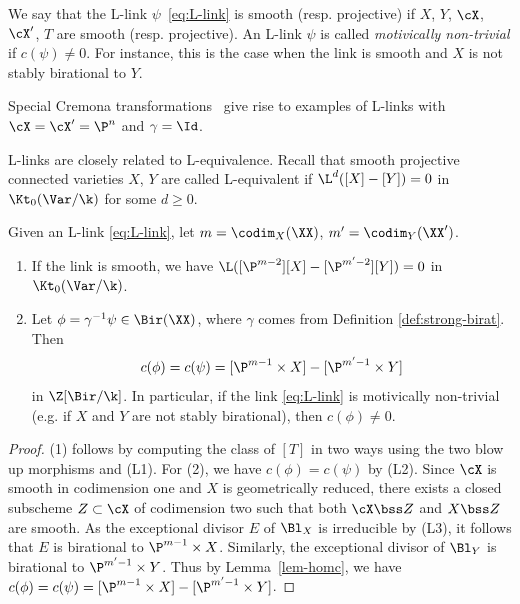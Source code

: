 We say that the L-link $\psi$~\eqref{eq:L-link} is smooth
(resp. projective)
if $X$, $Y$, $\cX$, $\cX'$, $T$
are smooth (resp. projective).
An L-link $\psi$
is called \emph{motivically non-trivial} if $c(\psi) \ne 0$.
For instance, this is the case when
the link is smooth and
$X$ is not stably birational to $Y$.


\begin{example}
\notready
Special Cremona transformations~\cite{Crauder-Katz} give rise
to examples of L-links with
$\cX = \cX' = \P^n$
and $\gamma = \Id$.
\end{example}

L-links are closely related to L-equivalence.
Recall that smooth
projective connected
varieties
$X$, $Y$
are
called
L-equivalent
if $\L^d([X]-[Y]) = 0$
in $\Kt_0(\Var/\k)$
for some $d \ge 0$.

\begin{lemma}
\notready\label{lemma:L-link}
Given an L-link \eqref{eq:L-link},
let $m = \codim_X(\XX)$,
$m' = \codim_Y(\XX')$.
\begin{enumerate}
\item If the link is smooth, we have
$\L([\P^{m-2}][X] - [\P^{m'-2}][Y]) = 0$ in $\Kt_0(\Var/\k)$.
\item Let $\phi = \gamma^{-1} \psi
\in \Bir(\XX)$, where $\gamma$ comes from Definition \ref{def:strong-birat}.
Then
$$c(\phi) = c(\psi) = [\P^{m-1} \times X] - [\P^{m'-1} \times Y]$$
in $\Z[\Bir/\k]$.
In particular, if the link \eqref{eq:L-link} is motivically non-trivial
(e.g. if $X$ and $Y$ are not stably
birational), then $c(\phi) \ne 0$.
\end{enumerate}
\end{lemma}
\begin{proof}
(1) follows by computing the class
of $[T]$ in two ways using the two
blow up morphisms and (L1).
For (2), we have $c(\phi) = c(\psi)$ by
(L2).
Since $\cX$ is smooth in codimension one
and $X$ is geometrically reduced,
there exists a closed subscheme $Z \subset \cX$ of codimension two
such that both $\cX \bss Z$ and $X \bss Z$ are smooth.
As the exceptional divisor $E$ of $\Bl_{X}$
is irreducible by (L3),
it follows that $E$ is birational to $\P^{m-1} \times X$.
Similarly,
the exceptional divisor of $\Bl_{Y}$
is birational to $\P^{m'-1} \times Y$.
Thus by Lemma~\ref{lem-homc}, we have
$c(\phi) = c(\psi) =  [\P^{m-1} \times X] - [\P^{m'-1} \times Y]$.
\end{proof}


